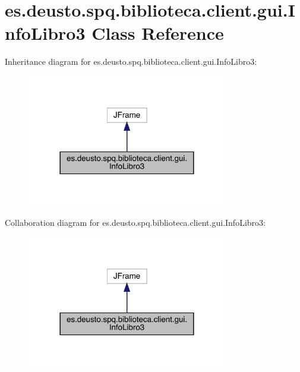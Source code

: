 \hypertarget{classes_1_1deusto_1_1spq_1_1biblioteca_1_1client_1_1gui_1_1_info_libro3}{}\section{es.\+deusto.\+spq.\+biblioteca.\+client.\+gui.\+Info\+Libro3 Class Reference}
\label{classes_1_1deusto_1_1spq_1_1biblioteca_1_1client_1_1gui_1_1_info_libro3}


Inheritance diagram for es.\+deusto.\+spq.\+biblioteca.\+client.\+gui.\+Info\+Libro3\+:
\nopagebreak
\begin{figure}[H]
\begin{center}
\leavevmode
\includegraphics[width=248pt]{classes_1_1deusto_1_1spq_1_1biblioteca_1_1client_1_1gui_1_1_info_libro3__inherit__graph}
\end{center}
\end{figure}


Collaboration diagram for es.\+deusto.\+spq.\+biblioteca.\+client.\+gui.\+Info\+Libro3\+:
\nopagebreak
\begin{figure}[H]
\begin{center}
\leavevmode
\includegraphics[width=248pt]{classes_1_1deusto_1_1spq_1_1biblioteca_1_1client_1_1gui_1_1_info_libro3__coll__graph}
\end{center}
\end{figure}

